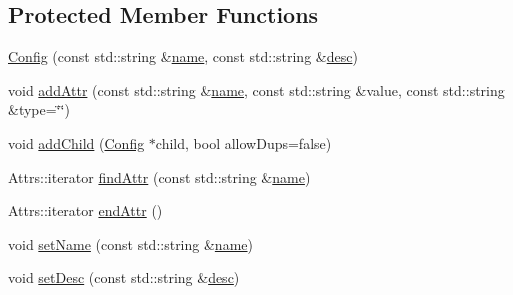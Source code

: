 \subsection*{Protected Member Functions}
\begin{DoxyCompactItemize}
\item 
\hyperlink{classtheoria_1_1config_1_1Config_a232146edc23baa804dbc82ffd3158f49}{Config} (const std\+::string \&\hyperlink{classtheoria_1_1config_1_1Config_af4929f1c9b86576fdc439051a10f89cd}{name}, const std\+::string \&\hyperlink{classtheoria_1_1config_1_1Config_a4d6b2e26d1139819769eaf6bb959b034}{desc})
\item 
void \hyperlink{classtheoria_1_1config_1_1Config_a043dff1e32568ef63eb10c557e6f672d}{add\+Attr} (const std\+::string \&\hyperlink{classtheoria_1_1config_1_1Config_af4929f1c9b86576fdc439051a10f89cd}{name}, const std\+::string \&value, const std\+::string \&type=\char`\"{}\char`\"{})
\item 
void \hyperlink{classtheoria_1_1config_1_1Config_ad96085447d36129bb53057c28bc43e4b}{add\+Child} (\hyperlink{classtheoria_1_1config_1_1Config}{Config} $\ast$child, bool allow\+Dups=false)
\item 
Attrs\+::iterator \hyperlink{classtheoria_1_1config_1_1Config_a5c3e05b3d7119443b0bcb61eb0404829}{find\+Attr} (const std\+::string \&\hyperlink{classtheoria_1_1config_1_1Config_af4929f1c9b86576fdc439051a10f89cd}{name})
\item 
Attrs\+::iterator \hyperlink{classtheoria_1_1config_1_1Config_adc788e451cd49c6b2c85948bf8f9fb21}{end\+Attr} ()
\item 
void \hyperlink{classtheoria_1_1config_1_1Config_a75b3cca96301a65a4eef01d5c36166c6}{set\+Name} (const std\+::string \&\hyperlink{classtheoria_1_1config_1_1Config_af4929f1c9b86576fdc439051a10f89cd}{name})
\item 
void \hyperlink{classtheoria_1_1config_1_1Config_adf4e6820b56f6ae52678b493819504ac}{set\+Desc} (const std\+::string \&\hyperlink{classtheoria_1_1config_1_1Config_a4d6b2e26d1139819769eaf6bb959b034}{desc})
\end{DoxyCompactItemize}
